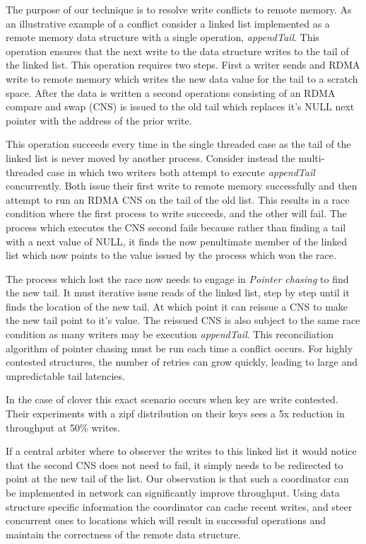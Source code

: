 The purpose of our technique is to resolve write conflicts to remote
memory. As an illustrative example of a conflict consider a linked
list implemented as a remote memory data structure with a single
operation, \textit{appendTail}. This operation ensures that the next
write to the data structure writes to the tail of the linked list.
This operation requires two steps.  First a writer sends and RDMA
write to remote memory which writes the new data value for the tail to
a scratch space. After the data is written a second operations
consisting of an RDMA compare and swap (CNS) is issued to the old tail
which replaces it's NULL next pointer with the address of the prior
write.

This operation succeeds every time in the single threaded case as the
tail of the linked list is never moved by another process. Consider
instead the multi-threaded case in which two writers both attempt to
execute \textit{appendTail} concurrently. Both issue their first write
to remote memory successfully and then attempt to run an RDMA CNS on
the tail of the old list. This results in a race condition where the
first process to write succeeds, and the other will fail. The process
which executes the CNS second fails because rather than finding a tail
with a next value of NULL, it finds the now penultimate member of the
linked list which now points to the value issued by the process which
won the race. 

The process which lost the race now needs to engage in \textit{Pointer
chasing} to find the new tail. It must iterative issue reads of the
linked list, step by step until it finds the location of the new tail.
At which point it can reissue a CNS to make the new tail point to it's
value. The reissued CNS is also subject to the same race condition as
many writers may be execution \textit{appendTail}. This reconciliation
algorithm of pointer chasing must be run each time a conflict occurs.
For highly contested structures, the number of retries can grow
quickly, leading to large and unpredictable tail latencies.

In the case of clover this exact scenario occurs when key are write
contested. Their experiments with a zipf distribution on their keys
sees a 5x reduction in throughput at 50\% writes.

If a central arbiter where to observer the writes to this linked list
it would notice that the second CNS does not need to fail, it simply
needs to be redirected to point at the new tail of the list. 
Our observation is that such a coordinator can be implemented in
network can significantly improve throughput. Using data structure
specific information the coordinator can cache recent writes, and
steer concurrent ones to locations which will result in successful
operations and maintain the correctness of the remote data structure.

